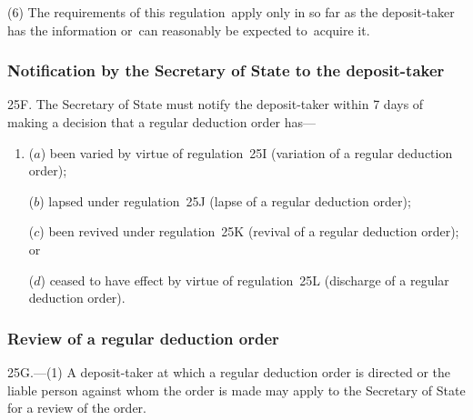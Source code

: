 \documentclass[12pt,a4paper]{article}
\begin{document}
(6) The requirements of this regulation~apply only in so far as the deposit-taker has the information or~can reasonably be expected to~acquire it.


\subsubsection[25F. Notification by the 
Secretary of State  %
to the deposit-taker]{Notification by the 
Secretary of State  %
to the deposit-taker}

25F.  The 
Secretary of State  %
must notify the deposit-taker within 7 days of making a decision that a regular deduction order has—
\begin{enumerate}\item[]
($a$) been varied by virtue of regulation~25I (variation of a regular deduction order);

($b$) lapsed under regulation~25J (lapse of a regular deduction order);

($c$) been revived under regulation~25K (revival of a regular deduction order); or

($d$) ceased to have effect by virtue of regulation~25L (discharge of a regular deduction order).
\end{enumerate}


\subsubsection[25G. Review of a regular deduction order]{Review of a regular deduction order}

25G.---(1)  A deposit-taker at which a regular deduction order is directed or the liable person against whom the order is made may apply to the 
Secretary of State  %
for a review of the order.
\end{document}
